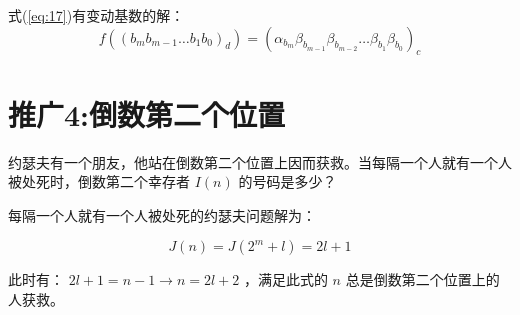 \documentclass[10pt,a4paper,UTF8]{article}
\begin{document}
式(\ref{eq:17})有变动基数的解：
\begin{equation}
\label{eq:18}
f((b_{m}b_{m-1}\ldots b_{1}b_{0})_{d}) = (\alpha_{b_{m}} \beta_{b_{m-1}} \beta_{b_{m-2}} \ldots \beta_{b_{1}} \beta_{b_{0}})_{c}
\end{equation}
\section{推广4:倒数第二个位置}
\label{sec:orgheadline7}


约瑟夫有一个朋友，他站在倒数第二个位置上因而获救。当每隔一个人就有一个人被处死时，倒数第二个幸存者 \(I(n)\) 的号码是多少？

每隔一个人就有一个人被处死的约瑟夫问题解为：

\begin{equation}
\label{eq:19}
J(n) = J(2^{m} +l) =  2l +1
\end{equation}

此时有： \(2l +1 = n-1 \rightarrow  n=2l +2\) ，满足此式的 \(n\) 总是倒数第二个位置上的人获救。
\end{document}
